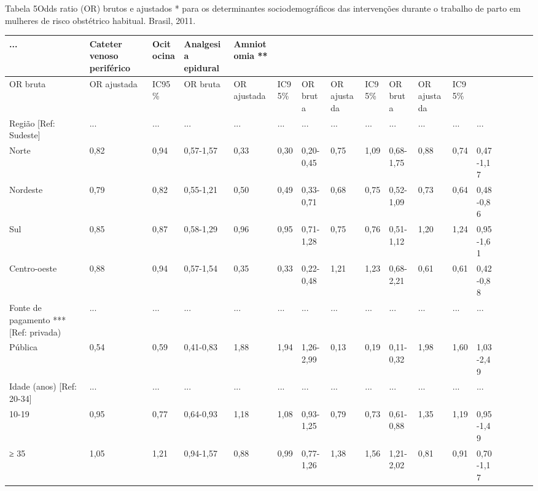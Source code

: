 \documentclass{article}
\begin{document}
Tabela 5Odds ratio (OR) brutos e ajustados * para os determinantes
sociodemográficos das intervenções durante o trabalho de parto em
mulheres de risco obstétrico habitual. Brasil, 2011.
\begin{table}
\begin{xtabular}{ l | l | l | l | l l | l | l | l | l | l | l | l | l | l | l |
l }
\hline... & Cateter venoso periférico & Ocitocina & Analgesia epidural & Amniotomia
**\\ \hline
OR bruta & OR ajustada & IC95\% & OR bruta & OR ajustada & IC95\% & OR bruta &
OR ajustada & IC95\% & OR bruta & OR ajustada & IC95\%\\ \hline
Região [Ref: Sudeste]
& ...
& ...
& ...
& ...
& ...
& ...
& ...
& ...
& ...
& ...
& ...
& ...
\\ \hline

Norte
& 0,82
& 0,94
& 0,57-1,57
& 0,33
& 0,30
& 0,20-0,45
& 0,75
& 1,09
& 0,68-1,75
& 0,88
& 0,74
& 0,47-1,17
\\ \hline

Nordeste
& 0,79
& 0,82
& 0,55-1,21
& 0,50
& 0,49
& 0,33-0,71
& 0,68
& 0,75
& 0,52-1,09
& 0,73
& 0,64
& 0,48-0,86
\\ \hline

Sul
& 0,85
& 0,87
& 0,58-1,29
& 0,96
& 0,95
& 0,71-1,28
& 0,75
& 0,76
& 0,51-1,12
& 1,20
& 1,24
& 0,95-1,61
\\ \hline

Centro-oeste
& 0,88
& 0,94
& 0,57-1,54
& 0,35
& 0,33
& 0,22-0,48
& 1,21
& 1,23
& 0,68-2,21
& 0,61
& 0,61
& 0,42-0,88
\\ \hline

Fonte de pagamento *** [Ref: privada)
& ...
& ...
& ...
& ...
& ...
& ...
& ...
& ...
& ...
& ...
& ...
& ...
\\ \hline

Pública
& 0,54
& 0,59
& 0,41-0,83
& 1,88
& 1,94
& 1,26-2,99
& 0,13
& 0,19
& 0,11-0,32
& 1,98
& 1,60
& 1,03-2,49
\\ \hline

Idade (anos) [Ref: 20-34]
& ...
& ...
& ...
& ...
& ...
& ...
& ...
& ...
& ...
& ...
& ...
& ...
\\ \hline

10-19
& 0,95
& 0,77
& 0,64-0,93
& 1,18
& 1,08
& 0,93-1,25
& 0,79
& 0,73
& 0,61-0,88
& 1,35
& 1,19
& 0,95-1,49
\\ \hline

≥ 35
& 1,05
& 1,21
& 0,94-1,57
& 0,88
& 0,99
& 0,77-1,26
& 1,38
& 1,56
& 1,21-2,02
& 0,81
& 0,91
& 0,70-1,17
\\ \hline


\end{xtabular}
\end{table}
\end{document}

